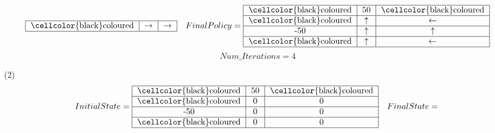 \documentclass[letter, 10pt]{article}
\begin{document}
\begin{itemize}
\begin{equation*}
\begin{tabular}{ |c|c|c| }
                                    \hline
                                    \cellcolor{black}coloured & $\rightarrow$ & $\rightarrow$\\
                                    \hline
                                    \end{tabular}\quad 
                    Final Policy =   \begin{tabular}{ |c|c|c| } 
                                    \hline
                                    \cellcolor{black}coloured & 50 & \cellcolor{black}coloured\\
                                    \hline
                                    \cellcolor{black}coloured & $\uparrow$ & $\leftarrow$\\
                                    \hline
                                    -50 & $\uparrow$ & $\uparrow$\\
                                    \hline
                                    \cellcolor{black}coloured & $\uparrow$ & $\leftarrow$\\
                                    \hline
                                    \end{tabular}
                \end{equation*}
                \begin{equation*}
                    Num\_Iterations = 4
                \end{equation*}
    \item[(2)] \begin{equation*}
                    Initial State = \begin{tabular}{ |c|c|c| } 
                                    \hline
                                    \cellcolor{black}coloured & 50 & \cellcolor{black}coloured\\
                                    \hline
                                    \cellcolor{black}coloured & 0 & 0\\
                                    \hline
                                    -50 & 0 & 0\\
                                    \hline
                                    \cellcolor{black}coloured & 0 & 0\\
                                    \hline
                                    \end{tabular}\quad 
                    Final State =   \begin{tabular}{ |c|c|c| } 
                                    \hline

\end{tabular}
\end{equation*}
\end{itemize}
\end{document}
